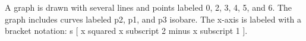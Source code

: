A graph is drawn with several lines and points labeled 0, 2, 3, 4, 5, and 6. The graph includes curves labeled p2, p1, and p3 isobare. The x-axis is labeled with a bracket notation: s [ x squared x subscript 2 minus x subscript 1 ].